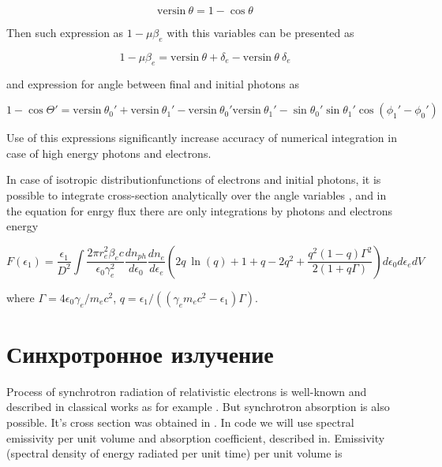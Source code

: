 \begin{equation}
	\text{versin}~\theta = 1 - \cos \theta
\end{equation}

Then such expression as $1 - \mu \beta_e$ with this variables can be presented as

\begin{equation}
	1 - \mu \beta_e =\text{versin}~\theta + \delta_e - \text{versin}~\theta~\delta_e
\end{equation}

and expression for angle between final and initial photons as

\begin{equation}
	1 - \cos \Theta' = \text{versin}~\theta_0' + \text{versin}~\theta_1' - \text{versin}~ \theta_0' \text{versin}~\theta_1' - \sin \theta_0'\sin \theta_1' \cos(\phi_1'-\phi_0')
\end{equation}

Use of this expressions significantly increase accuracy of numerical integration in case of high energy photons and electrons.

In case of isotropic distributionfunctions of electrons and initial photons, it is possible to integrate cross-section analytically over the angle variables \cite{JonesCompton, BykovUvarov2000}, and in the equation for enrgy flux there are only integrations by photons and electrons energy

\begin{equation}
	F(\epsilon_1)=\frac{\epsilon_1}{D^2}\int \frac{2 \pi r_e^2 \beta_e c}{\epsilon_0 \gamma_e^2} \frac{dn_{ph}}{d\epsilon_0}\frac{dn_e}{d\epsilon_e}(2 q~ \ln(q)+1+q-2q^2+\frac{q^2(1-q)\Gamma^2}{2(1+q\Gamma)})d\epsilon_0 d\epsilon_e dV
\end{equation}

where $\Gamma=4\epsilon_0\gamma_e/m_e c^2$, $q=\epsilon_1/((\gamma_e m_e c^2-\epsilon_1)\Gamma)$.

\section{Синхротронное излучение}\label{synchrotronFormulaSection}

Process of synchrotron radiation of relativistic electrons is well-known and described in classical works as for example \cite{Ginzburg1975}. But synchrotron absorption is also possible. It's cross section was obtained in \cite{Ghisellini1991}. In code we will use spectral emissivity per unit volume and absorption coefficient, described in\cite{Ghisellini}.
Emissivity (spectral density of energy radiated per unit time) per unit volume is

